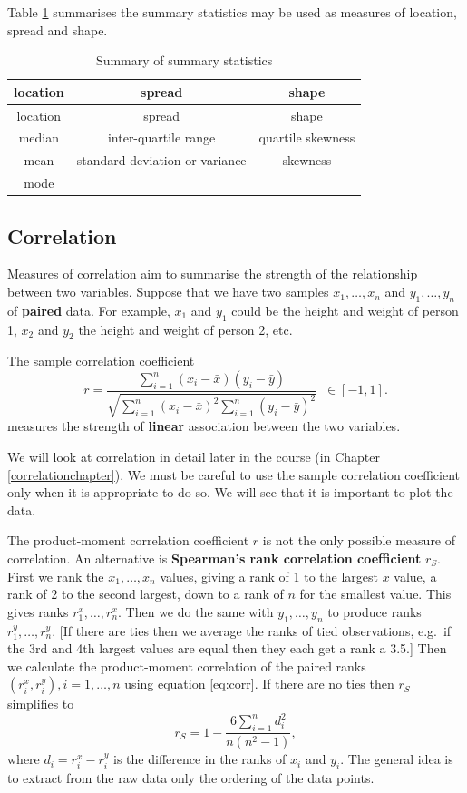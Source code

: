 \documentclass[
  11pt,
  british,
  openany, a4paper]{book}
\begin{document}
Table \ref{tab:sumstats} summarises the summary statistics may be used as measures of location, spread and shape.

\begin{longtable}[]{@{}ccc@{}}
\caption{\label{tab:sumstats} Summary of summary statistics}\tabularnewline
\toprule
location & spread & shape\tabularnewline
\midrule
\endfirsthead
\toprule
location & spread & shape\tabularnewline
\midrule
\endhead
median & inter-quartile range & quartile skewness\tabularnewline
mean & standard deviation or variance & skewness\tabularnewline
mode & &\tabularnewline
\bottomrule
\end{longtable}

\hypertarget{correlation}{%
\subsection{Correlation}\label{correlation}}

Measures of correlation aim to summarise the strength of the relationship between two variables. Suppose that we have two samples \(x_1,\ldots,x_n\) and \(y_1,\ldots,y_n\) of \textbf{paired} data. For example, \(x_1\) and \(y_1\) could be the height and weight of person 1, \(x_2\) and \(y_2\) the height and weight of person 2, etc.

The sample correlation coefficient
\begin{equation}
r = \frac{\displaystyle\sum_{i=1}^n (x_i-\bar{x})(y_i-
\bar{y})}{\sqrt{\displaystyle\sum_{i=1}^n (x_i-\bar{x})^2 \displaystyle\sum_{i=1}^n(y_i-
\bar{y})^2}} \,\,\, \in [-1, 1]. 
\label{eq:corr}
\end{equation}
measures the strength of \textbf{linear} association between the two variables.

We will look at correlation in detail later in the course (in Chapter \ref{correlationchapter}). We must be careful to use the sample correlation coefficient only when it is appropriate to do so. We will see that it is important to plot the data.

The product-moment correlation coefficient \(r\) is not the only possible measure of correlation. An alternative is \textbf{Spearman's rank correlation coefficient} \(r_S\). First we rank the \(x_1,\ldots,x_n\) values, giving a rank of 1 to the largest \(x\) value, a rank of 2 to the second largest, down to a rank of \(n\) for the smallest value. This gives ranks \(r^x_1, \ldots, r^x_n\). Then we do the same with \(y_1,\ldots,y_n\) to produce ranks \(r^y_1, \ldots, r^y_n\). {[}If there are ties then we average the ranks of tied observations, e.g.~if the 3rd and 4th largest values are equal then they each get a rank a 3.5.{]} Then we calculate the product-moment correlation of the paired ranks\((r^x_i, r^y_i), i=1,\ldots,n\) using equation \eqref{eq:corr}. If there are no ties then \(r_S\) simplifies to
\[r_S = 1- \frac{6\displaystyle\sum_{i=1}^n d_i^2}{n(n^2-1)}, \]
where \(d_i=r^x_i-r^y_i\) is the difference in the ranks of \(x_i\) and \(y_i\). The general idea is to extract from the raw data only the ordering of the data points.
\end{document}
